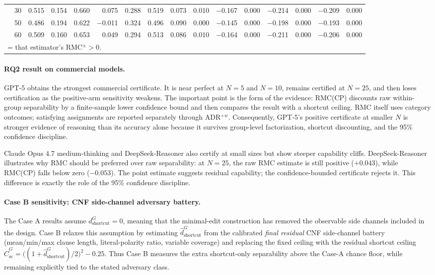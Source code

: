 \documentclass[conference]{IEEEtran}
\theoremstyle{remark}
\newcommand{\RMC}{\mathrm{RMC}}
\newcommand{\shortcutDisc}{d_{\mathrm{shortcut}}^{G}}
\newcommand{\hatshortcutDisc}{\hat d_{\mathrm{shortcut}}^{G}}
\newcommand{\hatshortcutCeiling}{\widehat{C}_{\mathrm{sc}}^{G}}
\begin{document}
\begin{table}[t]
{\begin{tabular}{p{2.2cm}r rrrr rr rr rr rr rr}
  & 30 & 0.515 & 0.154 & 0.660 & 0.075 & 0.288 & 0.519 & 0.073 & 0.010 & $-$0.167 & 0.000 & $-$0.214 & 0.000 & $-$0.209 & 0.000 \\
  & 50 & 0.486 & 0.194 & 0.622 & $-$0.011 & 0.324 & 0.496 & 0.090 & 0.000 & $-$0.145 & 0.000 & $-$0.198 & 0.000 & $-$0.193 & 0.000 \\
  & 60 & 0.509 & 0.160 & 0.653 & 0.049 & 0.294 & 0.513 & 0.086 & 0.010 & $-$0.164 & 0.000 & $-$0.211 & 0.000 & $-$0.206 & 0.000 \\
\bottomrule
\multicolumn{16}{l}{\colorbox{green!15}{\phantom{X}} = that estimator's $\RMC^{\pm}>0$.}
\end{tabular}%
}
\end{table}



\paragraph{RQ2 result on commercial models.}
GPT-5 obtains the strongest commercial certificate.  It is near perfect at $N=5$ and $N=10$, remains certified at $N=25$, and then loses certification as the positive-arm sensitivity weakens.  The important point is the form of the evidence: RMC(CP) discounts raw within-group separability by a finite-sample lower confidence bound and then compares the result with a shortcut ceiling.  RMC itself uses category outcomes; satisfying assignments are reported separately through ADR$^{+w}$.  Consequently, GPT-5's positive certificate at smaller $N$ is stronger evidence of reasoning than its accuracy alone because it survives group-level factorization, shortcut discounting, and the 95\% confidence discipline.

Claude Opus 4.7 medium-thinking and DeepSeek-Reasoner also certify at small sizes but show steeper capability cliffs.  DeepSeek-Reasoner illustrates why RMC should be preferred over raw separability: at $N=25$, the raw RMC estimate is still positive ($+0.043$), while RMC(CP) falls below zero ($-0.053$).  The point estimate suggests residual capability; the confidence-bounded certificate rejects it.  This difference is exactly the role of the 95\% confidence discipline.

\paragraph{Case B sensitivity: CNF side-channel adversary battery.}
The Case A results assume $\shortcutDisc=0$, meaning that the minimal-edit construction has removed the observable side channels included in the design.  Case B relaxes this assumption by estimating $\hatshortcutDisc$ from the calibrated \emph{final residual} CNF side-channel battery (mean/min/max clause length, literal-polarity ratio, variable coverage) and replacing the fixed ceiling with the residual shortcut ceiling $\hatshortcutCeiling=\bigl((1+\hatshortcutDisc)/2\bigr)^2-0.25$.  Thus Case B measures the extra shortcut-only separability above the Case-A chance floor, while remaining explicitly tied to the stated adversary class.
\end{document}
